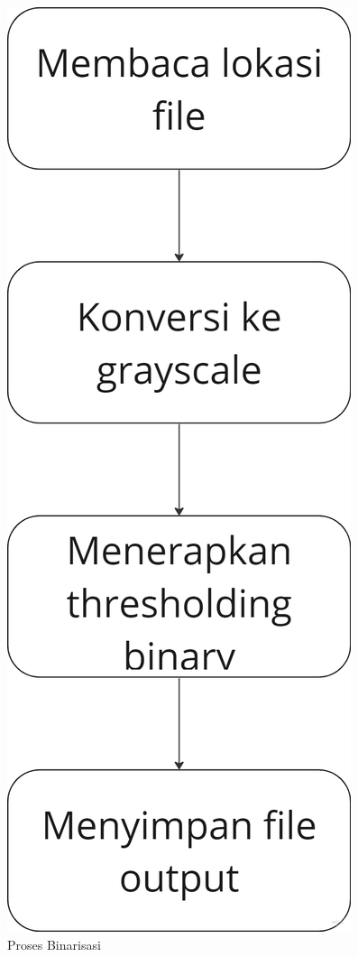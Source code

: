 \begin{figure} [H] \centering
  \includegraphics[scale=0.1]{gambar/bab3/preflow2.png}
  \caption{Proses Binarisasi}
  \label{fig:preflow2}
\end{figure}

